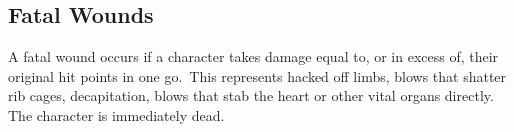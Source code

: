 

\subsection{Fatal Wounds}
A fatal wound occurs if a character takes damage equal to, or in excess of, their original hit points in one go. This represents hacked off limbs, blows that shatter rib cages, decapitation, blows that stab the heart or other vital organs directly. The character is immediately dead. 

